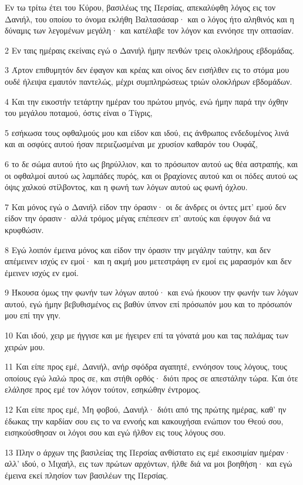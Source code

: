 \par Εν τω τρίτω έτει του Κύρου, βασιλέως της Περσίας, απεκαλύφθη λόγος εις τον Δανιήλ, του οποίου το όνομα εκλήθη Βαλτασάσαρ· και ο λόγος ήτο αληθινός και η δύναμις των λεγομένων μεγάλη· και κατέλαβε τον λόγον και εννόησε την οπτασίαν.
\par 2 Εν ταις ημέραις εκείναις εγώ ο Δανιήλ ήμην πενθών τρεις ολοκλήρους εβδομάδας.
\par 3 Άρτον επιθυμητόν δεν έφαγον και κρέας και οίνος δεν εισήλθεν εις το στόμα μου ουδέ ήλειψα εμαυτόν παντελώς, μέχρι συμπληρώσεως τριών ολοκλήρων εβδομάδων.
\par 4 Και την εικοστήν τετάρτην ημέραν του πρώτου μηνός, ενώ ήμην παρά την όχθην του μεγάλου ποταμού, όστις είναι ο Τίγρις,
\par 5 εσήκωσα τους οφθαλμούς μου και είδον και ιδού, εις άνθρωπος ενδεδυμένος λινά και αι οσφύες αυτού ήσαν περιεζωσμέναι με χρυσίον καθαρόν του Ουφάζ,
\par 6 το δε σώμα αυτού ήτο ως βηρύλλιον, και το πρόσωπον αυτού ως θέα αστραπής, και οι οφθαλμοί αυτού ως λαμπάδες πυρός, και οι βραχίονες αυτού και οι πόδες αυτού ως όψις χαλκού στίλβοντος, και η φωνή των λόγων αυτού ως φωνή όχλου.
\par 7 Και μόνος εγώ ο Δανιήλ είδον την όρασιν· οι δε άνδρες οι όντες μετ' εμού δεν είδον την όρασιν· αλλά τρόμος μέγας επέπεσεν επ' αυτούς και έφυγον διά να κρυφθώσιν.
\par 8 Εγώ λοιπόν έμεινα μόνος και είδον την όρασιν την μεγάλην ταύτην, και δεν απέμεινεν ισχύς εν εμοί· και η ακμή μου μετεστράφη εν εμοί εις μαρασμόν και δεν έμεινεν ισχύς εν εμοί.
\par 9 Ήκουσα όμως την φωνήν των λόγων αυτού· και ενώ ήκουον την φωνήν των λόγων αυτού, εγώ ήμην βεβυθισμένος εις βαθύν ύπνον επί πρόσωπόν μου και το πρόσωπόν μου επί την γην.
\par 10 Και ιδού, χειρ με ήγγισε και με ήγειρεν επί τα γόνατά μου και τας παλάμας των χειρών μου.
\par 11 Και είπε προς εμέ, Δανιήλ, ανήρ σφόδρα αγαπητέ, εννόησον τους λόγους, τους οποίους εγώ λαλώ προς σε, και στήθι ορθός· διότι προς σε απεστάλην τώρα. Και ότε ελάλησε προς εμέ τον λόγον τούτον, εσηκώθην έντρομος.
\par 12 Και είπε προς εμέ, Μη φοβού, Δανιήλ· διότι από της πρώτης ημέρας, καθ' ην έδωκας την καρδίαν σου εις το να εννοής και κακουχήσαι ενώπιον του Θεού σου, εισηκούσθησαν οι λόγοι σου και εγώ ήλθον εις τους λόγους σου.
\par 13 Πλην ο άρχων της βασιλείας της Περσίας ανθίστατο εις εμέ εικοσιμίαν ημέραν· αλλ' ιδού, ο Μιχαήλ, εις των πρώτων αρχόντων, ήλθε διά να μοι βοηθήση· και εγώ έμεινα εκεί πλησίον των βασιλέων της Περσίας.
